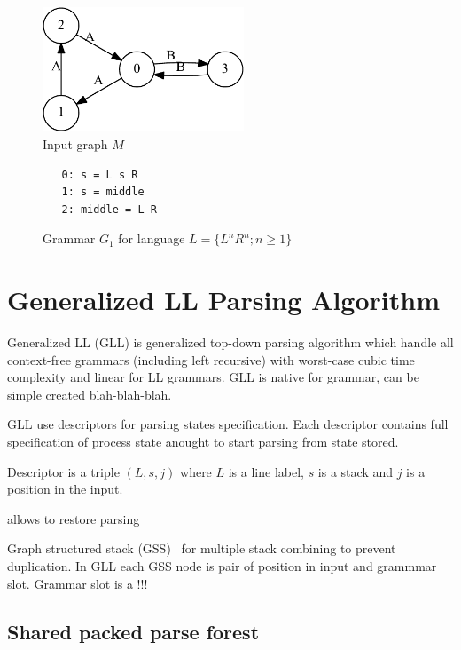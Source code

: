 \documentclass{sig-alternate} %
\begin{document}
\begin{figure}[h]
    \begin{center}
        \includegraphics[width=6cm]{dot/input.pdf}
        \caption{Input graph $M$}
        \label{input}        
    \end{center}
\end{figure}

\begin{figure}[h]
   \begin{center}
\begin{verbatim}
   0: s = L s R 
   1: s = middle
   2: middle = L R
\end{verbatim}
   \caption{Grammar $G_1$ for language $L=\{L^n R^n; n \geq 1\}$}
   \label{grammarG}        
   \end{center}
\end{figure}



\section{Generalized LL Parsing Algorithm}

Generalized LL (GLL) is generalized top-down parsing algorithm which handle all context-free grammars (including left recursive) with worst-case cubic time complexity and linear for LL grammars.
GLL is native for grammar, can be simple created blah-blah-blah.

GLL use descriptors for parsing states specification.
Each descriptor contains full specification of process state anought to start parsing from state stored.

Descriptor is a triple $(L, s, j)$ where $L$ is a line label, $s$ is a stack and $j$ is a position in the input.

allows to restore parsing

Graph structured stack (GSS)~\cite{Tomita} for multiple stack combining to prevent duplication.
In GLL each GSS node is pair of position in input and grammmar slot. Grammar slot is a !!! 

\subsection{Shared packed parse forest}
\end{document}
